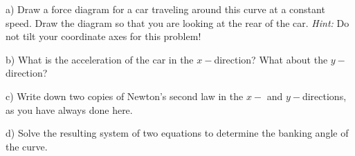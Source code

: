 \documentclass[12pt]{article}
\begin{document}
a) Draw a force diagram for a car traveling around this curve at a constant speed. Draw the diagram so that you are looking at the rear of the car. {\it Hint:} Do not tilt your coordinate axes for this problem!


\vspace{3in}

b) What is the acceleration of the car in the $x-$direction? What about the $y-$direction?

\vspace{1in}

c) Write down two copies of Newton's second law in the $x-$ and $y-$directions, as you have always done here.

\vspace{2in}

\newpage

d) Solve the resulting system of two equations to determine the banking angle of the curve.
\end{document}
